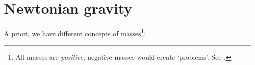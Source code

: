 \section{Newtonian gravity}
\label{sec:newton}

A priori, we have different concepts of masses\footnote{All masses are 
\emph{positive}; negative masses would create `problems'. See 
\cite{Bondi_1957}.}: